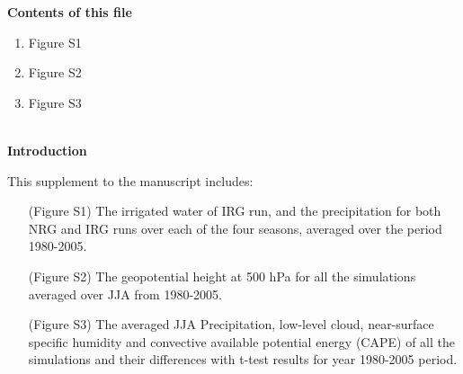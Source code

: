 \documentclass[draft,ms]{agutexSI}
\begin{document}
\begin{article}

%
%



\noindent\textbf{Contents of this file}
\begin{enumerate}
\item Figure S1
\item Figure S2
\item Figure S3
\end{enumerate}
\ \\

\noindent\textbf{Introduction}


This supplement to the manuscript includes:

\begin{itemize}

\item[(Figure S1)] The irrigated water of IRG run, and the precipitation for both NRG and IRG runs over each of the four seasons, averaged over the period 1980-2005. 

\item[(Figure S2)] The geopotential height at 500 hPa for all the simulations averaged over JJA from 1980-2005.

\item[(Figure S3)] The averaged JJA Precipitation, low-level cloud, near-surface specific humidity and convective available potential energy (CAPE) of all the simulations and their differences with t-test results for year 1980-2005 period.

\end{itemize}


%
%


%

%
%
\end{article}
\clearpage
\end{document}

